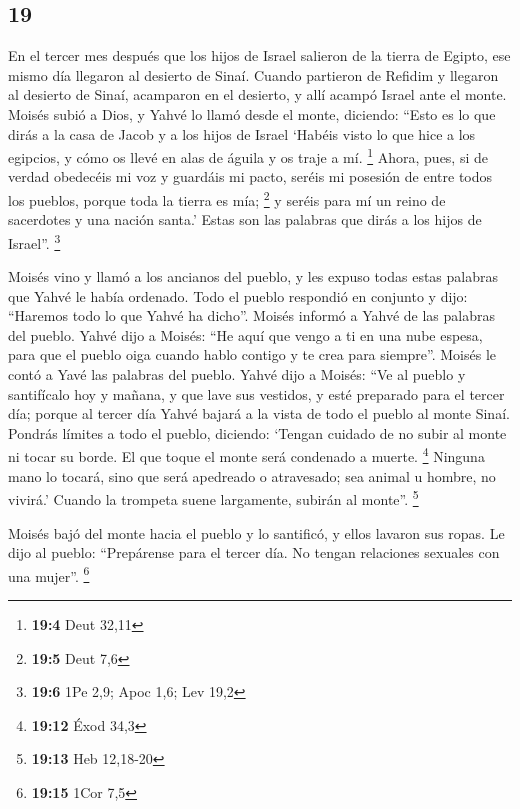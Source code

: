 \begin{paracol}{2}
\hypertarget{section-36}{%
\section{19}\label{section-36}}

 En el tercer mes después que los hijos de Israel salieron
de la tierra de Egipto, ese mismo día llegaron al desierto de Sinaí.
 Cuando partieron de Refidim y llegaron al desierto de
Sinaí, acamparon en el desierto, y allí acampó Israel ante el monte.
 Moisés subió a Dios, y Yahvé lo llamó desde el monte,
diciendo: ``Esto es lo que dirás a la casa de Jacob y a los hijos de
Israel  `Habéis visto lo que hice a los egipcios, y cómo
os llevé en alas de águila y os traje a mí. \footnote{\textbf{19:4} Deut
  32,11}  Ahora, pues, si de verdad obedecéis mi voz y
guardáis mi pacto, seréis mi posesión de entre todos los pueblos, porque
toda la tierra es mía; \footnote{\textbf{19:5} Deut 7,6} 
y seréis para mí un reino de sacerdotes y una nación santa.' Estas son
las palabras que dirás a los hijos de Israel''. \footnote{\textbf{19:6}
  1Pe 2,9; Apoc 1,6; Lev 19,2}

 Moisés vino y llamó a los ancianos del pueblo, y les
expuso todas estas palabras que Yahvé le había ordenado. 
Todo el pueblo respondió en conjunto y dijo: ``Haremos todo lo que Yahvé
ha dicho''. Moisés informó a Yahvé de las palabras del pueblo.
 Yahvé dijo a Moisés: ``He aquí que vengo a ti en una nube
espesa, para que el pueblo oiga cuando hablo contigo y te crea para
siempre''. Moisés le contó a Yavé las palabras del pueblo.
 Yahvé dijo a Moisés: ``Ve al pueblo y santifícalo hoy y
mañana, y que lave sus vestidos,  y esté preparado para
el tercer día; porque al tercer día Yahvé bajará a la vista de todo el
pueblo al monte Sinaí.  Pondrás límites a todo el pueblo,
diciendo: `Tengan cuidado de no subir al monte ni tocar su borde. El que
toque el monte será condenado a muerte. \footnote{\textbf{19:12} Éxod
  34,3}  Ninguna mano lo tocará, sino que será apedreado
o atravesado; sea animal u hombre, no vivirá.' Cuando la trompeta suene
largamente, subirán al monte''. \footnote{\textbf{19:13} Heb 12,18-20}

 Moisés bajó del monte hacia el pueblo y lo santificó, y
ellos lavaron sus ropas.  Le dijo al pueblo: ``Prepárense
para el tercer día. No tengan relaciones sexuales con una mujer''.
\footnote{\textbf{19:15} 1Cor 7,5}


\end{paracol}
